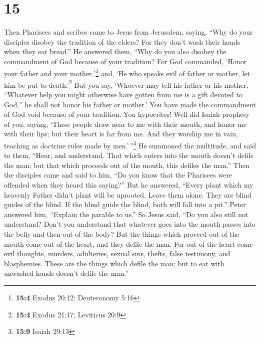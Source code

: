 \hypertarget{section-14}{%
\section{15}\label{section-14}}

 Then Pharisees and scribes came to Jesus from Jerusalem,
saying,  ``Why do your disciples disobey the tradition of
the elders? For they don't wash their hands when they eat bread.''
 He answered them, ``Why do you also disobey the
commandment of God because of your tradition?  For God
commanded, `Honor your father and your mother,'\footnote{\textbf{15:4}
  Exodus 20:12; Deuteronomy 5:16} and, `He who speaks evil of father or
mother, let him be put to death.'\footnote{\textbf{15:4} Exodus 21:17;
  Leviticus 20:9}  But you say, `Whoever may tell his
father or his mother, ``Whatever help you might otherwise have gotten
from me is a gift devoted to God,''  he shall not honor
his father or mother.' You have made the commandment of God void because
of your tradition.  You hypocrites! Well did Isaiah
prophesy of you, saying,  `These people draw near to me
with their mouth, and honor me with their lips; but their heart is far
from me.  And they worship me in vain, teaching as
doctrine rules made by men.'\,''\footnote{\textbf{15:9} Isaiah 29:13}
 He summoned the multitude, and said to them, ``Hear, and
understand.  That which enters into the mouth doesn't
defile the man; but that which proceeds out of the mouth, this defiles
the man.''  Then the disciples came and said to him, ``Do
you know that the Pharisees were offended when they heard this saying?''
 But he answered, ``Every plant which my heavenly Father
didn't plant will be uprooted.  Leave them alone. They
are blind guides of the blind. If the blind guide the blind, both will
fall into a pit.''  Peter answered him, ``Explain the
parable to us.''  So Jesus said, ``Do you also still not
understand?  Don't you understand that whatever goes into
the mouth passes into the belly and then out of the body?
 But the things which proceed out of the mouth come out
of the heart, and they defile the man.  For out of the
heart come evil thoughts, murders, adulteries, sexual sins, thefts,
false testimony, and blasphemies.  These are the things
which defile the man; but to eat with unwashed hands doesn't defile the
man.''

